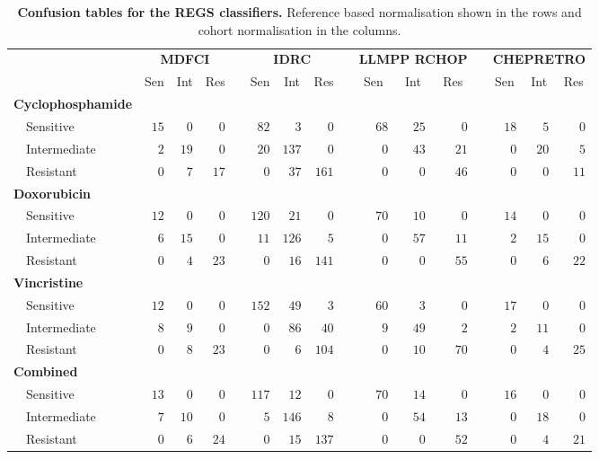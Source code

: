 \documentclass[10pt]{bmc_article}
\newenvironment{bmcformat}{\fussy\setboolean{publ}{true}}{\fussy}
\begin{document}
\begin{bmcformat}
\begin{table}[!tbp]
\small
\caption{\textbf{Confusion tables for the REGS classifiers.} Reference based normalisation shown in the rows and cohort normalisation in the columns.\label{tab:confusiondrugreference}}
\begin{center}
\begin{tabular}{lrrrcrrrcrrrcrrr}
\toprule
\multicolumn{1}{l}{\bfseries  }&\multicolumn{3}{c}{\bfseries MDFCI}&\multicolumn{1}{c}{\bfseries }&\multicolumn{3}{c}{\bfseries IDRC}&\multicolumn{1}{c}{\bfseries }&\multicolumn{3}{c}{\bfseries LLMPP RCHOP}&\multicolumn{1}{c}{\bfseries }&\multicolumn{3}{c}{\bfseries CHEPRETRO}\tabularnewline
\cline{2-4} \cline{6-8} \cline{10-12} \cline{14-16}
\multicolumn{1}{l}{}&\multicolumn{1}{c}{Sen}&\multicolumn{1}{c}{Int}&\multicolumn{1}{c}{Res}&\multicolumn{1}{c}{}&\multicolumn{1}{c}{Sen}&\multicolumn{1}{c}{Int}&\multicolumn{1}{c}{Res}&\multicolumn{1}{c}{}&\multicolumn{1}{c}{Sen}&\multicolumn{1}{c}{Int}&\multicolumn{1}{c}{Res}&\multicolumn{1}{c}{}&\multicolumn{1}{c}{Sen}&\multicolumn{1}{c}{Int}&\multicolumn{1}{c}{Res}\tabularnewline
\hline
{\bfseries Cyclophosphamide}&&&&&&&&&&&&&&&\tabularnewline
~~Sensitive&$15$&$ 0$&$ 0$&&$ 82$&$  3$&$  0$&&$68$&$25$&$ 0$&&$18$&$ 5$&$ 0$\tabularnewline
~~Intermediate&$ 2$&$19$&$ 0$&&$ 20$&$137$&$  0$&&$ 0$&$43$&$21$&&$ 0$&$20$&$ 5$\tabularnewline
~~Resistant&$ 0$&$ 7$&$17$&&$  0$&$ 37$&$161$&&$ 0$&$ 0$&$46$&&$ 0$&$ 0$&$11$\tabularnewline
\hline
{\bfseries Doxorubicin}&&&&&&&&&&&&&&&\tabularnewline
~~Sensitive&$12$&$ 0$&$ 0$&&$120$&$ 21$&$  0$&&$70$&$10$&$ 0$&&$14$&$ 0$&$ 0$\tabularnewline
~~Intermediate&$ 6$&$15$&$ 0$&&$ 11$&$126$&$  5$&&$ 0$&$57$&$11$&&$ 2$&$15$&$ 0$\tabularnewline
~~Resistant&$ 0$&$ 4$&$23$&&$  0$&$ 16$&$141$&&$ 0$&$ 0$&$55$&&$ 0$&$ 6$&$22$\tabularnewline
\hline
{\bfseries Vincristine}&&&&&&&&&&&&&&&\tabularnewline
~~Sensitive&$12$&$ 0$&$ 0$&&$152$&$ 49$&$  3$&&$60$&$ 3$&$ 0$&&$17$&$ 0$&$ 0$\tabularnewline
~~Intermediate&$ 8$&$ 9$&$ 0$&&$  0$&$ 86$&$ 40$&&$ 9$&$49$&$ 2$&&$ 2$&$11$&$ 0$\tabularnewline
~~Resistant&$ 0$&$ 8$&$23$&&$  0$&$  6$&$104$&&$ 0$&$10$&$70$&&$ 0$&$ 4$&$25$\tabularnewline
\hline
{\bfseries Combined}&&&&&&&&&&&&&&&\tabularnewline
~~Sensitive&$13$&$ 0$&$ 0$&&$117$&$ 12$&$  0$&&$70$&$14$&$ 0$&&$16$&$ 0$&$ 0$\tabularnewline
~~Intermediate&$ 7$&$10$&$ 0$&&$  5$&$146$&$  8$&&$ 0$&$54$&$13$&&$ 0$&$18$&$ 0$\tabularnewline
~~Resistant&$ 0$&$ 6$&$24$&&$  0$&$ 15$&$137$&&$ 0$&$ 0$&$52$&&$ 0$&$ 4$&$21$\tabularnewline
\hline
\end{tabular}
\end{center}
\end{table}

\end{bmcformat}
\end{document}
